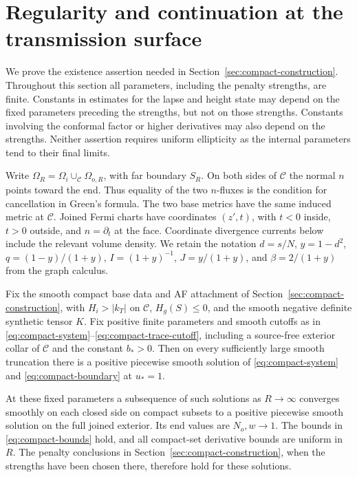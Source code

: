 \section{Regularity and continuation at the transmission surface}
\label{sec:transmission-analysis}

We prove the existence assertion needed in Section~\ref{sec:compact-construction}.
Throughout this section all parameters, including the penalty strengths, are
finite.  Constants in estimates for the lapse and height state may depend on
the fixed parameters preceding the strengths, but not on those strengths.
Constants involving the conformal factor or higher derivatives may also
depend on the strengths.  Neither assertion requires uniform ellipticity as
the internal parameters tend to their final limits.

Write $\Omega_R=\Omega_i\cup_{\mathcal C}\Omega_{o,R}$, with far boundary
$S_R$.  On both sides of $\mathcal C$ the normal $n$ points toward the end.
Thus equality of the two $n$-fluxes is the condition for cancellation in
Green's formula.  The two base metrics have the same induced metric at
$\mathcal C$.  Joined Fermi charts have coordinates $(z',t)$, with
$t<0$ inside, $t>0$ outside, and $n=\partial_t$ at the face.  Coordinate
divergence currents below include the relevant volume density.  We retain
the notation $d=s/N$, $y=1-d^2$, $q=(1-y)/(1+y)$,
$I=(1+y)^{-1}$, $J=y/(1+y)$, and $\beta=2/(1+y)$ from the graph calculus.

\begin{proposition}
\label{prop:transmission-existence}
Fix the smooth compact base data and AF attachment of
Section~\ref{sec:compact-construction}, with $H_i>|k_T|$ on
$\mathcal C$, $H_g(S)\leq0$, and the smooth negative definite synthetic
tensor $K$.  Fix positive finite parameters and smooth cutoffs as in
\eqref{eq:compact-system}--\eqref{eq:compact-trace-cutoff}, including a
source-free exterior collar of $\mathcal C$ and the constant $b_*>0$.
Then on every sufficiently large smooth truncation there is a positive
piecewise smooth solution of \eqref{eq:compact-system} and
\eqref{eq:compact-boundary} at $u_*=1$.

At these fixed parameters a subsequence of such solutions as $R\to\infty$
converges smoothly on each closed side on compact subsets to a positive
piecewise smooth solution on the full joined exterior.  Its end values are
$N_o,w\to1$.  The bounds in \eqref{eq:compact-bounds} hold, and all
compact-set derivative bounds are uniform in $R$.  The penalty conclusions
in Section~\ref{sec:compact-construction}, when the strengths have been
chosen there, therefore hold for these solutions.
\end{proposition}

